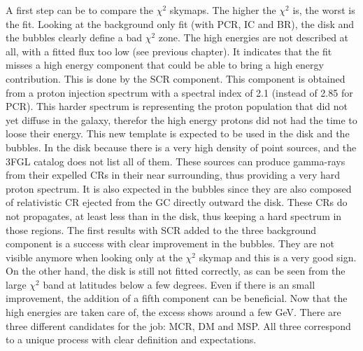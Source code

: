 A first step can be to compare the $\chi^2$ skymaps. The higher the $\chi^2$ is, the worst is the fit. Looking at the background only fit (with PCR, IC and BR), the disk and the bubbles clearly define a bad  $\chi^2$ zone. The high energies are not described at all, with a fitted flux too low (see previous chapter). It indicates that the fit misses a high energy component that could be able to bring a high energy contribution. This is done by the SCR component. This component is obtained from a proton injection spectrum with a spectral index of 2.1 (instead of 2.85 for PCR). This harder spectrum is representing the proton population that did not yet diffuse in the galaxy, therefor the high energy protons did not had the time to loose their energy. This new template is expected to be used in the disk and the bubbles. In the disk because there is a very high density of point sources, and the 3FGL catalog does not list all of them. These sources can produce gamma-rays from their expelled CRs in their near surrounding, thus providing a very hard proton spectrum. It is also expected in the bubbles since they are also composed of relativistic CR ejected from the GC directly outward the disk. These CRs do not propagates, at least less than in the disk, thus keeping a hard spectrum in those regions. 
The first results with SCR added to the three background component is a success with clear improvement in the bubbles. They are not visible anymore when looking only at the  $\chi^2$ skymap and this is a very good sign. On the other hand, the disk is still not fitted correctly, as can be seen from the large  $\chi^2$ band at latitudes below a few degrees. Even if there is an small improvement, the addition of a fifth component can be beneficial.
Now that the high energies are taken care of, the excess shows around a few GeV. There are three different candidates for the job: MCR, DM and MSP. All three correspond to a unique process with clear definition and expectations.

